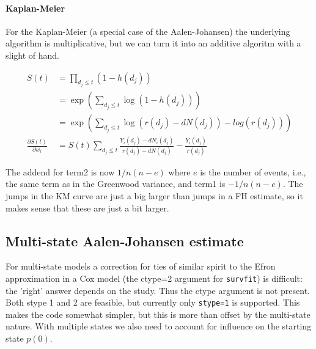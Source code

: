 \documentclass{article}
\newcommand{\code}[1]{\texttt{#1}}
\begin{document}
\paragraph{Kaplan-Meier}
For the Kaplan-Meier (a special case of the Aalen-Johansen) the underlying
algorithm is multiplicative, but we can turn it into an additive
algoritm with a slight of hand.

\begin{align*}
  S(t) &= \prod_{d_j\le t} (1- h(d_j)) \\
       &= \exp \left(\sum_{d_j\le t} \log(1- h(d_j)) \right) \\
       &= \exp \left(\sum_{d_j\le t} \log(r(d_j) - dN(d_j)) - log(r(d_j)) \right) \\
  \frac{\partial S(t)}{\partial w_i} &= 
               S(t) \sum_{d_j\le t} \frac{Y_i(d_j) - dN_i(d_j)}{r(d_j) - dN(d_j)} -
                           \frac{Y_i(d_j)}{ r(d_j)}   
\end{align*}

The addend for term2 is now $1/n(n-e)$ where $e$ is the number of events, i.e.,
the same term as in the Greenwood variance, and term1 is $-1/n(n-e)$. 
The jumps in the KM curve are just a big larger than jumps in a FH estimate,
so it makes sense that these are just a bit larger.


\subsection{Multi-state Aalen-Johansen estimate}
For multi-state models a correction for ties of similar spirit to the 
Efron approximation in a Cox model (the ctype=2 argument for \code{survfit})
is difficult: the 'right' answer depends on the study.
Thus the ctype argument is not present.  
Both stype 1 and 2 are feasible, but currently only \code{stype=1} is
supported.
This makes the code somewhat simpler, but this is more than offset by the 
multi-state nature.
With multiple states we also need to account for influence on the starting
state $p(0)$.
\end{document}
